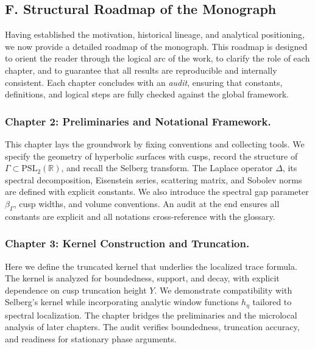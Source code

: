 
\subsection*{F. Structural Roadmap of the Monograph}

Having established the motivation, historical lineage, and analytical positioning,
we now provide a detailed roadmap of the monograph.
This roadmap is designed to orient the reader through the logical arc of the work,
to clarify the role of each chapter, and to guarantee
that all results are reproducible and internally consistent.
Each chapter concludes with an \emph{audit}, ensuring that constants, definitions,
and logical steps are fully checked against the global framework.

\subsubsection*{Chapter 2: Preliminaries and Notational Framework.}
This chapter lays the groundwork by fixing conventions and collecting tools.
We specify the geometry of hyperbolic surfaces with cusps,
record the structure of $\Gamma\subset \mathrm{PSL}_2(\mathbb{R})$,
and recall the Selberg transform.
The Laplace operator $\Delta$, its spectral decomposition,
Eisenstein series, scattering matrix, and Sobolev norms are defined with explicit constants.
We also introduce the spectral gap parameter $\beta_\Gamma$,
cusp widths, and volume conventions.
An audit at the end ensures all constants are explicit
and all notations cross-reference with the glossary.

\subsubsection*{Chapter 3: Kernel Construction and Truncation.}
Here we define the truncated kernel that underlies the localized trace formula.
The kernel is analyzed for boundedness, support, and decay,
with explicit dependence on cusp truncation height $Y$.
We demonstrate compatibility with Selberg’s kernel
while incorporating analytic window functions $h_\eta$ tailored to spectral localization.
The chapter bridges the preliminaries and the microlocal analysis of later chapters.
The audit verifies boundedness, truncation accuracy,
and readiness for stationary phase arguments.

